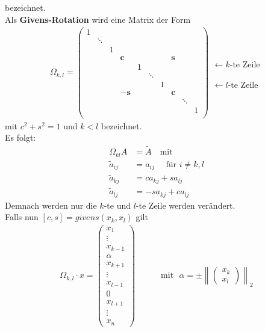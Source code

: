 \documentclass[ngerman,fontsize=11pt, paper=a4, parskip=half, titlepage=true, toc=bib]{scrbook}
\theoremstyle{definition}
\theoremstyle{plain}
\newcommand{\nn}[1]{\left\| #1 \right\|}
\begin{document}
  bezeichnet. \\
  Als \textbf{Givens-Rotation} wird eine Matrix der Form
  \begin{gather}
    \Omega _{k,l} = \begin{pmatrix}
      1 &&&&&&&&& \\
      & \ddots\\
      && 1\\
      &&& \mathbf{c} &&&& \mathbf{s} \\
      &&&& 1\\
      &&&&& \ddots \\
      &&&&&& 1\\
      &&& -\mathbf{s} &&&& \mathbf{c} \\
      &&&&&&&& \ddots \\
      &&&&&&&&& 1\\
    \end{pmatrix}
    \begin{array}{l}
      \\   \leftarrow \text{$k$-te Zeile}
      \\ \\ \\ \\ \leftarrow \text{$l$-te Zeile}
    \end{array}
    \label{VI.4.5}
  \end{gather}
  mit $c^2+s^2=1$ und $k<l$ bezeichnet.\\
  Es folgt:
  \begin{align*}
    \Omega_{kl} A &= \widetilde{A} \quad \text{mit} \\
    \widetilde{a}_{ij}  &= a_{ij} \quad \text{ für } i\neq k,l \\
    \widetilde{a}_{kj} & = ca_{kj}+sa_{lj} \\
    \widetilde{a}_{lj} & = -sa_{kj} + ca_{lj}
  \end{align*}
  Demnach werden nur die $k$-te und $l$-te Zeile werden verändert. \\
  Falls nun $[c,s] = givens(x_k, x_l)$ gilt
  \begin{gather*}
    \Omega_{k,l}\cdot x = \begin{pmatrix}
      x_1 \\ \vdots \\x_{k-1} \\\alpha \\ x_{k+1}
      \\\vdots \\
      x_{l-1} \\ 0 \\x_{l+1} \\\vdots \\x_n
    \end{pmatrix}
    \qquad
    \quad \text{mit~~}
    \alpha = \pm \nn{  \begin{pmatrix} x_k \\ x_l\end{pmatrix}}_2
  \end{gather*}
\end{document}
